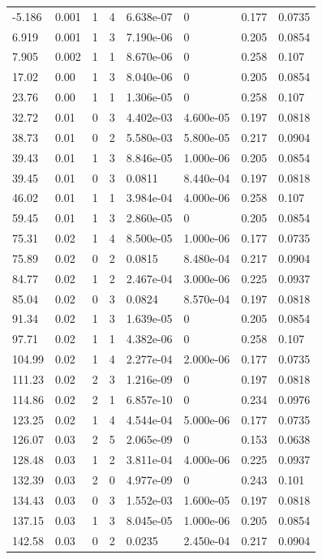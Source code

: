 \documentclass[preview]{standalone}
\begin{document}
{{\begin{tabular}{L{1.2cm}C{1.2cm} C{0.3cm}C{0.5cm} C{1.4cm}C{1.4cm} C{1.4cm}C{1.4cm}}
  -5.186  &  0.001  & 1     &  4 &  6.638e-07  & 0  & 0.177 &  0.0735   \\ 
  6.919  &  0.001  & 1     &  3 &  7.190e-06  & 0  & 0.205 &  0.0854   \\ 
  7.905  &  0.002  & 1     &  1 &  8.670e-06  & 0  & 0.258 &  0.107   \\ 
  17.02  &  0.00  & 1     &  3 &  8.040e-06  & 0  & 0.205 &  0.0854   \\ 
  23.76  &  0.00  & 1     &  1 &  1.306e-05  & 0  & 0.258 &  0.107   \\ 
  32.72  &  0.01  & 0     &  3 &  4.402e-03  & 4.600e-05  & 0.197 &  0.0818   \\ 
  38.73  &  0.01  & 0     &  2 &  5.580e-03  & 5.800e-05  & 0.217 &  0.0904   \\ 
  39.43  &  0.01  & 1     &  3 &  8.846e-05  & 1.000e-06  & 0.205 &  0.0854   \\ 
  39.45  &  0.01  & 0     &  3 &  0.0811  & 8.440e-04  & 0.197 &  0.0818   \\ 
  46.02  &  0.01  & 1     &  1 &  3.984e-04  & 4.000e-06  & 0.258 &  0.107   \\ 
  59.45  &  0.01  & 1     &  3 &  2.860e-05  & 0  & 0.205 &  0.0854   \\ 
  75.31  &  0.02  & 1     &  4 &  8.500e-05  & 1.000e-06  & 0.177 &  0.0735   \\ 
  75.89  &  0.02  & 0     &  2 &  0.0815  & 8.480e-04  & 0.217 &  0.0904   \\ 
  84.77  &  0.02  & 1     &  2 &  2.467e-04  & 3.000e-06  & 0.225 &  0.0937   \\ 
  85.04  &  0.02  & 0     &  3 &  0.0824  & 8.570e-04  & 0.197 &  0.0818   \\ 
  91.34  &  0.02  & 1     &  3 &  1.639e-05  & 0  & 0.205 &  0.0854   \\ 
  97.71  &  0.02  & 1     &  1 &  4.382e-06  & 0  & 0.258 &  0.107   \\ 
  104.99  &  0.02  & 1     &  4 &  2.277e-04  & 2.000e-06  & 0.177 &  0.0735   \\ 
  111.23  &  0.02  & 2     &  3 &  1.216e-09  & 0  & 0.197 &  0.0818   \\ 
  114.86  &  0.02  & 2     &  1 &  6.857e-10  & 0  & 0.234 &  0.0976   \\ 
  123.25  &  0.02  & 1     &  4 &  4.544e-04  & 5.000e-06  & 0.177 &  0.0735   \\ 
  126.07  &  0.03  & 2     &  5 &  2.065e-09  & 0  & 0.153 &  0.0638   \\ 
  128.48  &  0.03  & 1     &  2 &  3.811e-04  & 4.000e-06  & 0.225 &  0.0937   \\ 
  132.39  &  0.03  & 2     &  0 &  4.977e-09  & 0  & 0.243 &  0.101   \\ 
  134.43  &  0.03  & 0     &  3 &  1.552e-03  & 1.600e-05  & 0.197 &  0.0818   \\ 
  137.15  &  0.03  & 1     &  3 &  8.045e-05  & 1.000e-06  & 0.205 &  0.0854   \\ 
  142.58  &  0.03  & 0     &  2 &  0.0235  & 2.450e-04  & 0.217 &  0.0904   \\ 
\hline 
\end{tabular} 

}}
\end{document}
